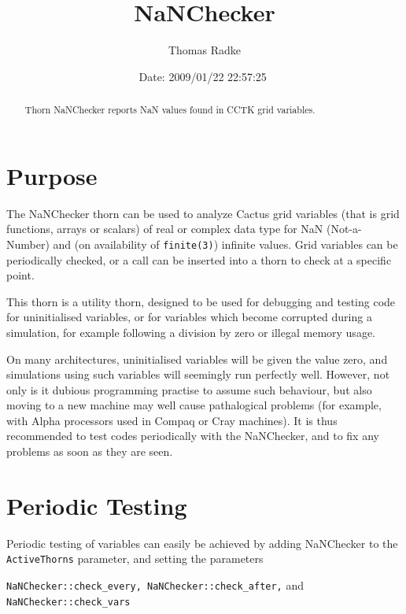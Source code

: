 \documentclass{article}
\begin{document}
\title{NaNChecker}
\author{Thomas Radke}
\date{$ $Date: 2009/01/22 22:57:25 $ $}

\maketitle


\begin{abstract}
Thorn NaNChecker reports NaN values found in CCTK grid variables.
\end{abstract}


\section{Purpose}

The NaNChecker thorn can be used to analyze Cactus grid variables (that is grid
functions, arrays or scalars) of real or complex data type for NaN
(Not-a-Number) and (on availability of {\tt finite(3)}) infinite
values. Grid variables can be periodically checked, or a call can 
be inserted into a thorn to check at a specific point.

This thorn is a utility thorn, designed to be used for debugging and
testing code for uninitialised variables, or for variables which 
become corrupted during a simulation, for example following a division
by zero or illegal memory usage.

On many architectures, uninitialised variables will be given the value
zero, and simulations using such variables will seemingly run perfectly 
well. However, not only is it dubious programming practise to assume such
behaviour, but also moving to a new machine may well cause pathalogical 
problems (for example, with Alpha processors used in Compaq or Cray machines).
It is thus recommended to test codes periodically with the NaNChecker, 
and to fix any problems as soon as they are seen.

\section{Periodic Testing}

Periodic testing of variables can easily be achieved by adding NaNChecker
to the {\tt ActiveThorns} parameter, and setting the parameters 

\noindent
{\tt NaNChecker::check\_every, NaNChecker::check\_after,} and {\tt NaNChecker::check\_vars} 
\end{document}
